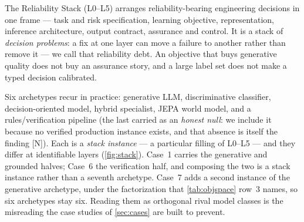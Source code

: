 The Reliability Stack (L0--L5) arranges reliability-bearing engineering decisions in one frame
--- task and risk specification, learning objective, representation, inference architecture,
output contract, assurance and control. It is a stack of \emph{decision problems}: a fix at one
layer can move a failure to another rather than remove it --- we call that
reliability debt. An objective that buys generative quality does not buy an assurance story, and
a large label set does not make a typed decision calibrated.

Six archetypes recur in practice: generative LLM, discriminative classifier, decision-oriented
model, hybrid specialist, JEPA world model, and a rules/verification pipeline (the last carried
as an \emph{honest null}: we include it because no verified production instance exists, and that
absence is itself the finding [N]). Each is a \emph{stack instance} --- a particular filling of
L0--L5 --- and they differ at identifiable layers (\cref{fig:stack}). Case~1 carries the
generative and grounded halves; Case~6 the
verification half, and composing the two is a stack instance rather than a seventh archetype.
Case~7 adds a second instance of the generative archetype, under the factorization that
\cref{tab:objspace} row~3 names, so six archetypes stay six.
Reading them as orthogonal rival model classes is the misreading the case studies of
\cref{sec:cases} are built to prevent.
